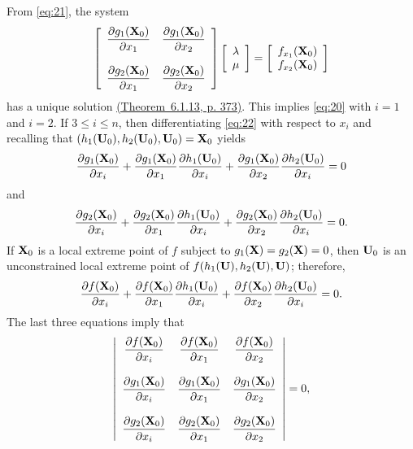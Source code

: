 \documentclass{article}
\newcommand{\dst}{\displaystyle}
\begin{document}
From   \eqref{eq:21}, the system
\begin{equation} \label{eq:23}
\left[\begin{array}{ccccccc}
\dst{\frac{{\partial g_{1}({\bf X}_{0})}}{{\partial  x_{1}}}}&
\dst{\frac{{\partial g_{1}({\bf X}_{0})}}{{\partial  x_{2}}}}\\\\
\dst{\frac{{\partial g_{2}({\bf X}_{0})}}{{\partial  x_{1}}}}&
\dst{\frac{{\partial g_{2}({\bf X}_{0})}}{{\partial  x_{2}}}}\\
\end{array}\right]
\left[\begin{array}{ccccccc}
\lambda\\\mu
\end{array}\right]=
\left[\begin{array}{ccccccc}
f_{x_{1}}({\bf X}_{0})\\f_{x_{2}}({\bf X}_{0})\\
\end{array}\right]
\end{equation}
has a unique solution
\href{http://ramanujan.math.trinity.edu/wtrench/texts/TRENCH_REAL_ANALYSIS.PDF}
{(Theorem~6.1.13, p. 373)}.
This implies \eqref{eq:20} with $i=1$ and $i=2$.
If  $3\le i\le n$, then differentiating \eqref{eq:22} with respect to
$x_{i}$ and recalling that
$(h_{1}({\bf U}_{0}),h_{2}({\bf U}_{0}),{\bf U}_{0})={\bf X}_{0}$
yields
$$
\frac{\partial g_{1}({\bf X}_{0})}{\partial x_{i}}+
\frac{\partial g_{1}({\bf X}_{0})}{\partial x_{1}}
\frac{\partial h_{1}({\bf U}_{0})}{\partial x_{i}}+
\frac{\partial g_{1}({\bf X}_{0})}{\partial x_{2}}
\frac{\partial h_{2}({\bf U}_{0})}{\partial x_{i}}=0
$$
and
$$
\frac{\partial g_{2}({\bf X}_{0})}{\partial x_{i}}+
\frac{\partial g_{2}({\bf X}_{0})}{\partial x_{1}}
\frac{\partial h_{1}({\bf U}_{0})}{\partial x_{i}}+
\frac{\partial g_{2}({\bf X}_{0})}{\partial x_{2}}
\frac{\partial h_{2}({\bf U}_{0})}{\partial x_{i}}=0.
$$
If
 ${\bf X}_{0}$ is a local extreme point of  $f$
subject to  $g_{1}({\bf X})=g_{2}({\bf X})=0$, then ${\bf U}_{0}$
is an unconstrained local extreme point of
$f(h_{1}({\bf U}),h_{2}({\bf U}),{\bf U})$; therefore,
$$
\frac{\partial f({\bf X}_{0})}{\partial x_{i}}+
\frac{\partial f({\bf X}_{0})}{\partial x_{1}}
\frac{\partial h_{1}({\bf U}_{0})}{\partial x_{i}}+
\frac{\partial f({\bf X}_{0})}{\partial x_{2}}
\frac{\partial h_{2}({\bf U}_{0})}{\partial x_{i}}=0.
$$
The last three equations imply that
$$
\left|\begin{array}{ccccccc}
\dst{\frac{{\partial f({\bf X}_{0})}}{{\partial  x_{i}}}}&
\dst{\frac{{\partial f({\bf X}_{0})}}{{\partial  x_{1}}}}&
\dst{\frac{{\partial f({\bf X}_{0})}}{{\partial  x_{2}}}}\\\\
\dst{\frac{{\partial g_{1}({\bf X}_{0})}}{{\partial  x_{i}}}}&
\dst{\frac{{\partial g_{1}({\bf X}_{0})}}{{\partial  x_{1}}}}&
\dst{\frac{{\partial g_{1}({\bf X}_{0})}}{{\partial  x_{2}}}}\\\\
\dst{\frac{{\partial g_{2}({\bf X}_{0})}}{{\partial  x_{i}}}}&
\dst{\frac{{\partial g_{2}({\bf X}_{0})}}{{\partial  x_{1}}}}&
\dst{\frac{{\partial g_{2}({\bf X}_{0})}}{{\partial  x_{2}}}}\\
\end{array}\right|=0,
$$
\end{document}
